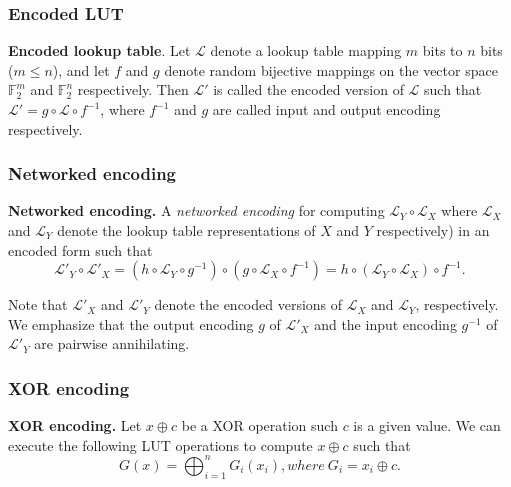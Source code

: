 \documentclass{beamer}
\begin{document}
\frame
{
\frametitle{Encoded LUT}
\noindent \textbf{Encoded lookup table}.  Let $\mathcal{L}$ denote a lookup table mapping $m$ bits to $n$ bits ($m \leq n$), and let $f$ and $g$ denote random bijective mappings on the vector space $\mathbb{F}^{m}_{2}$ and $\mathbb{F}^{n}_{2}$ respectively. Then $\mathcal{L}'$ is called the encoded version of $\mathcal{L}$ such that $\mathcal{L}' = g \circ \mathcal{L} \circ f^{-1}$, where $f^{-1}$ and $g$ are called input and output encoding respectively.
}

\frame
{
\frametitle{Networked encoding}
\noindent \textbf{Networked encoding.} A \textit{networked encoding} for computing $\mathcal{L}_{Y} \circ \mathcal{L}_{X}$ where $\mathcal{L}_{X}$ and $\mathcal{L}_{Y}$ denote the lookup table representations of $X$ and $Y$ respectively) in an encoded form such that
\[ \mathcal{L}'_{Y} \circ \mathcal{L}'_{X} = (h \circ \mathcal{L}_{Y} \circ g^{-1}) \circ (g \circ \mathcal{L}_{X} \circ f^{-1}) = h \circ (\mathcal{L}_{Y} \circ \mathcal{L}_{X}) \circ f^{-1}.\]

Note that $\mathcal{L}'_{X}$ and $\mathcal{L}'_{Y}$ denote the encoded versions of $\mathcal{L}_{X}$ and $\mathcal{L}_{Y}$, respectively. We emphasize that the output encoding $g$ of $\mathcal{L}'_{X}$ and the input encoding $g^{-1}$ of $\mathcal{L}'_{Y}$ are pairwise annihilating.
}

\frame
{
\frametitle{XOR encoding}
\noindent \textbf{XOR encoding.} Let $x \oplus c$ be a XOR operation such $c$ is a given value. We can execute the following LUT operations to compute $x \oplus c$ such that 
\[G(x) = \bigoplus ^{n}_{i=1} G_{i} (x_{i}), where \ G_{i} = x_{i} \oplus c.\]
}
\end{document}
